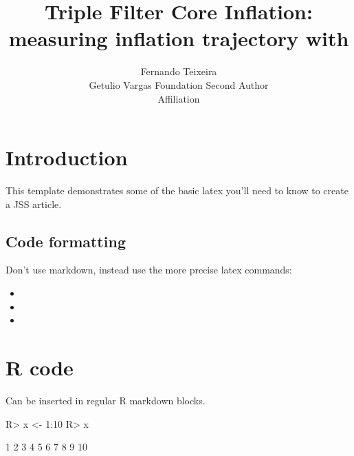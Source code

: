 \documentclass[article]{jss}
\author{
Fernando Teixeira\\Getulio Vargas Foundation \And Second Author\\Affiliation
}
\title{Triple Filter Core Inflation: measuring inflation trajectory with
\pkg{INFLATION}}
\providecommand{\tightlist}{%
  \setlength{\itemsep}{0pt}\setlength{\parskip}{0pt}}
\begin{document}
\section{Introduction}\label{introduction}

This template demonstrates some of the basic latex you'll need to know
to create a JSS article.

\subsection{Code formatting}\label{code-formatting}

Don't use markdown, instead use the more precise latex commands:

\begin{itemize}
\tightlist
\item
\item
\item
\end{itemize}

\section{R code}\label{r-code}

Can be inserted in regular R markdown blocks.

\begin{CodeChunk}

\begin{CodeInput}
R> x <- 1:10
R> x
\end{CodeInput}

\begin{CodeOutput}
 [1]  1  2  3  4  5  6  7  8  9 10
\end{CodeOutput}
\end{CodeChunk}
\end{document}
